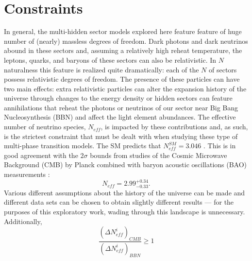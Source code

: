 \documentclass[nofootinbib,twocolumn,preprintnumbers]{revtex4-1}
\begin{document}
\section{Constraints}
\label{sec:constraints}
In general, the multi-hidden sector models explored here feature feature of huge number of (nearly) massless degrees of freedom. Dark photons and dark neutrinos abound in these sectors and, assuming a relatively high reheat temperature, the leptons, quarks, and baryons of these sectors can also be relativistic. In $N$naturalness this feature is realized quite dramatically: each of the $N$ of sectors possess relativistic degrees of freedom. The presence of these particles can have two main effects: extra relativistic particles can alter the expansion history of the universe through changes to the energy density or hidden sectors can feature annihilations that reheat the photons or neutrinos of our sector near Big Bang Nucleosynthesis (BBN) and affect the light element abundances. The effective number of neutrino species, $N_{eff}$, is impacted by these contributions and, as such, is the strictest constraint that must be dealt with when studying these type of multi-phase transition models. 
The SM predicts that $N^{SM}_{eff} = 3.046$ \cite{Mangano:2005cc}. This is in good agreement with the $2\sigma$ bounds from studies of the Cosmic Microwave Background (CMB) by Planck combined with baryon acoustic oscillations (BAO) measurements \cite{Aghanim:2018eyx}:
\begin{equation}\label{eqn:neffBounds}
N_{eff} = 2.99^{+0.34}_{-0.33}.
\end{equation}
Various different assumptions about the history of the universe can be made and different data sets can be chosen to obtain slightly different results \cite{Breitbach:2018ddu} --- for the purposes of this exploratory work, wading through this landscape is unnecessary. Additionally, 
\begin{equation}
\frac{(\Delta N^i_{eff})_{CMB}}{(\Delta N^i_{eff})_{BBN}} \geq 1
\end{equation}
\end{document}
